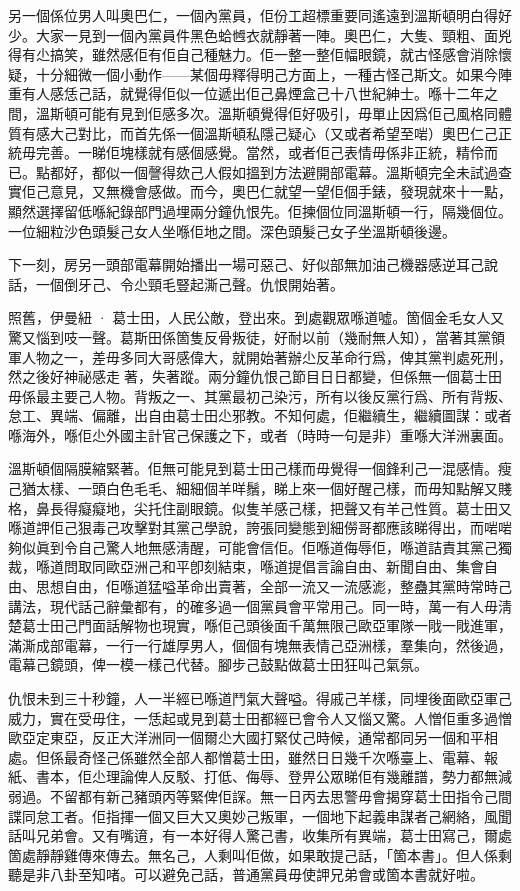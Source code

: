 另一個係位男人叫奧巴仁，一個內黨員，佢份工超標重要同遙遠到溫斯頓明白得好少。大家一見到一個內黨員件黑色蛤乸衣就靜著一陣。奧巴仁，大隻、頸粗、面兇得有尐搞笑，雖然感佢有佢自己種魅力。佢一整一整佢幅眼鏡，就古怪感會消除懷疑，十分細微一個小動作——某個毋釋得明己方面上，一種古怪己斯文。如果今陣重有人感恁己話，就覺得佢似一位遞出佢己鼻煙盒己十八世紀紳士。喺十二年之間，溫斯頓可能有見到佢感多次。溫斯頓覺得佢好吸引，毋單止因爲佢己風格同體質有感大己對比，而首先係一個溫斯頓私隱己疑心（又或者希望至啱）奧巴仁己正統毋完善。一睇佢塊樣就有感個感覺。當然，或者佢己表情毋係非正統，精伶而已。點都好，都似一個謦得欬己人假如搵到方法避開部電幕。溫斯頓完全未試過查實佢己意見，又無機會感做。而今，奧巴仁就望一望佢個手錶，發現就來十一點，顯然選擇留低喺紀錄部門過埋兩分鐘仇恨先。佢揀個位同溫斯頓一行，隔幾個位。一位細粒沙色頭髮己女人坐喺佢地之間。深色頭髮己女子坐溫斯頓後邊。

下一刻，房另一頭部電幕開始播出一場可惡己、好似部無加油己機器感逆耳己說話，一個倒牙己、令尐頸毛豎起澌己聲。仇恨開始著。

照舊，伊曼紐 · 葛士田，人民公敵，登出來。到處觀眾喺道噓。箇個金毛女人又驚又惱到吱一聲。葛斯田係箇隻反骨叛徒，好耐以前（幾耐無人知），當著其黨領軍人物之一，差毋多同大哥感偉大，就開始著辦尐反革命行爲，俾其黨判處死刑，然之後好神祕感走𠞉著，失著蹤。兩分鐘仇恨己節目日日都變，但係無一個葛士田毋係最主要己人物。背叛之一、其黨最初己染污，所有以後反黨行爲、所有背叛、怠工、異端、偏離，出自由葛士田尐邪教。不知何處，佢繼續生，繼續圖謀：或者喺海外，喺佢尐外國主計官己保護之下，或者（時時一句是非）重喺大洋洲裏面。

溫斯頓個隔膜縮緊著。佢無可能見到葛士田己樣而毋覺得一個鋒利己一混感情。瘦己猶太樣、一頭白色毛毛、細細個羊咩鬚，睇上來一個好醒己樣，而毋知點解又賤格，鼻長得癡癡地，尖托住副眼鏡。似隻羊感己樣，把聲又有羊己性質。葛士田又喺道䛅佢己狠毒己攻擊對其黨己學說，誇張同變態到細僗哥都應該睇得出，而啱啱夠似眞到令自己驚人地無感淸醒，可能會信佢。佢喺道侮辱佢，喺道詰責其黨己獨裁，喺道問取同歐亞洲己和平卽刻結束，喺道提倡言論自由、新聞自由、集會自由、思想自由，佢喺道猛嗌革命出賣著，全部一流又一流感滮，整蠱其黨時常時己講法，現代話己辭彙都有，的確多過一個黨員會平常用己。同一時，萬一有人毋淸楚葛士田己門面話解物也現實，喺佢己頭後面千萬無限己歐亞軍隊一戙一戙進軍，滿澌成部電幕，一行一行雄厚男人，個個有塊無表情己亞洲樣，羣集向，然後過，電幕己鏡頭，俾一模一樣己代替。腳步己鼓點做葛士田狂叫己氣氛。

仇恨未到三十秒鐘，人一半經已喺道鬥氣大聲嗌。得戚己羊樣，同埋後面歐亞軍己威力，實在受毋住，一恁起或見到葛士田都經已會令人又惱又驚。人憎佢重多過憎歐亞定東亞，反正大洋洲同一個爾尐大國打緊仗己時候，通常都同另一個和平相處。但係最奇怪己係雖然全部人都憎葛士田，雖然日日幾千次喺臺上、電幕、報紙、書本，佢尐理論俾人反駁、打低、侮辱、登畀公眾睇佢有幾離譜，勢力都無減弱過。不留都有新己豬頭丙等緊俾佢𧨾。無一日丙去思警毋會揭穿葛士田指令己間諜同怠工者。佢指揮一個又巨大又奧妙己叛軍，一個地下起義串謀者己網絡，風聞話叫兄弟會。又有嘴逳，有一本好得人驚己書，收集所有異端，葛士田寫己，爾處箇處靜靜雞傳來傳去。無名己，人剩叫佢做，如果敢提己話，「箇本書」。但人係剩聽是非八卦至知啫。可以避免己話，普通黨員毋使䛅兄弟會或箇本書就好啦。

